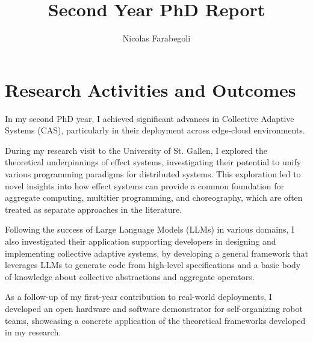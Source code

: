 \documentclass[runningheads]{llncs}
\begin{document}
%
\title{Second Year PhD Report}
%
%
\author{Nicolas Farabegoli}%
%
%
%
\maketitle              %
%

%
%
%
\section{Research Activities and Outcomes}
In my second PhD year,
I achieved significant advances in Collective Adaptive Systems (CAS),
particularly in their deployment across edge-cloud environments.

During my research visit to the University of St. Gallen,
I explored the theoretical underpinnings of effect systems,
investigating their potential to unify various programming paradigms for distributed systems.
%
This exploration led to novel insights into how effect systems can provide a common foundation for aggregate computing, multitier programming, and choreography,
which are often treated as separate approaches in the literature.

Following the success of Large Language Models (LLMs) in various domains,
I also investigated their application supporting developers in designing and implementing collective adaptive systems,
by developing a general framework that leverages LLMs to generate code from high-level specifications and a basic body of knowledge about collective abstractions and aggregate operators.

As a follow-up of my first-year contribution to real-world deployments,
I developed an open hardware and software demonstrator for self-organizing robot teams,
showcasing a concrete application of the theoretical frameworks developed in my research. 
\end{document}
